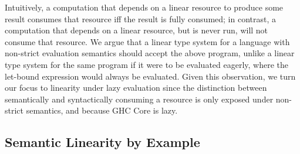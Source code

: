 \documentclass[acmsmall,review,screen]{acmart}
\begin{document}
%
Intuitively, a computation that depends on a linear resource to produce some
result consumes that resource iff the result is fully consumed; in
contrast, a computation that depends on a linear resource, but is never run,
will not consume that resource.
%
We argue that a linear type system for a language with non-strict evaluation
semantics should accept the above program, unlike a linear type system for the
same program if it were to be evaluated eagerly, where the let-bound
expression would always be evaluated.
%
Given this observation, %
%
we turn our focus to linearity under lazy evaluation since the distinction between semantically and syntactically
consuming a resource is only exposed under non-strict semantics, and because GHC Core is
lazy.



% 
% 
% 

\subsection{Semantic Linearity by Example\label{sec:semantic-linearity-examples}}
\end{document}
